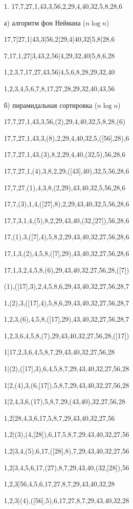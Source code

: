 \documentclass[russian]{article}
\begin{document}
1. 17,7,27,1,43,3,56,2,29,4,40,32,5,8,28,6

а) алгоритм фон Неймана ($n\log{n}$)

17,7|27,1|43,3|56,2|29,4|40,32|5,8|28,6

7,17,1,27|3,43,2,56|4,29,32,40|5,8,6,28

1,2,3,7,17,27,43,56|4,5,6,8,28,29,32,40

1,2,3,4,5,6,7,8,17,27,28,29,32,40,43,56

б) пирамидальная сортировка ($n\log{n}$)

17,7,27,1,43,3,56,(2),29,4,40,32,5,8,28,(6)

17,7,27,1,43,3,(8),2,29,4,40,32,5,([56],28),6

17,7,27,1,43,(3),8,2,29,4,40,(32,5),56,28,6

17,7,27,1,(4),3,8,2,29,([43],40),32,5,56,28,6

17,7,27,(1),4,3,8,(2,29),43,40,32,5,56,28,6

17,7,(3),1,4,([27],8),2,29,43,40,32,5,56,28,6

17,7,3,1,4,(5),8,2,29,43,40,(32,[27]),56,28,6

17,(1),3,([7],4),5,8,2,29,43,40,32,27,56,28,6

17,1,3,(2),4,5,8,([7],29),43,40,32,27,56,28,6

17,1,3,2,4,5,8,(6),29,43,40,32,27,56,28,([7])

(1),([17],3),2,4,5,8,6,29,43,40,32,27,56,28,7

1,(2),3,([17],4),5,8,6,29,43,40,32,27,56,28,7

1,2,3,(6),4,5,8,([17],29),43,40,32,27,56,28,7

1,2,3,6,4,5,8,(7),29,43,40,32,27,56,28,([17])

1|17,2,3,6,4,5,8,7,29,43,40,32,27,56,28

1|(2),([17],3),6,4,5,8,7,29,43,40,32,27,56,28

1|2,(4),3,(6,[17]),5,8,7,29,43,40,32,27,56,28

1|2,4,3,6,(17),5,8,7,29,(43,40),32,27,56,28

1,2|28,4,3,6,17,5,8,7,29,43,40,32,27,56

1,2|(3),(4,[28]),6,17,5,8,7,29,43,40,32,27,56

1,2|3,4,(5),6,17,([28],8),7,29,43,40,32,27,56

1,2|3,4,5,6,17,(27),8,7,29,43,40,(32,[28]),56

1,2,3|56,4,5,6,17,27,8,7,29,43,40,32,28

1,2,3|(4),([56],5),6,17,27,8,7,29,43,40,32,28
\end{document}
